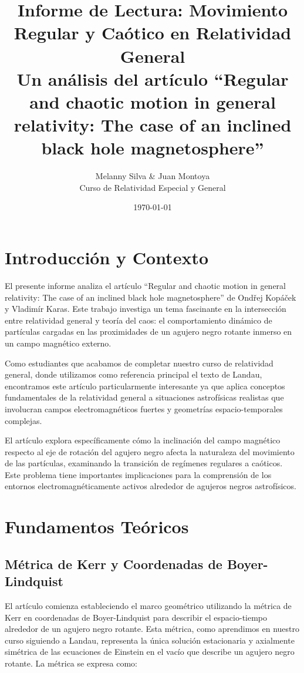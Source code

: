\documentclass[a4paper,12pt]{article}
\title{Informe de Lectura: Movimiento Regular y Caótico en Relatividad General\\
\large Un análisis del artículo ``Regular and chaotic motion in general relativity: The case of an inclined black hole magnetosphere''}
\author{Melanny Silva \& Juan Montoya\\
\small{Curso de Relatividad Especial y General}}
\date{\today}
\begin{document}
\maketitle

\section{Introducción y Contexto}

El presente informe analiza el artículo ``Regular and chaotic motion in general relativity: The case of an inclined black hole magnetosphere'' de Ondřej Kopáček y Vladimír Karas. Este trabajo investiga un tema fascinante en la intersección entre relatividad general y teoría del caos: el comportamiento dinámico de partículas cargadas en las proximidades de un agujero negro rotante inmerso en un campo magnético externo.

Como estudiantes que acabamos de completar nuestro curso de relatividad general, donde utilizamos como referencia principal el texto de Landau, encontramos este artículo particularmente interesante ya que aplica conceptos fundamentales de la relatividad general a situaciones astrofísicas realistas que involucran campos electromagnéticos fuertes y geometrías espacio-temporales complejas.

El artículo explora específicamente cómo la inclinación del campo magnético respecto al eje de rotación del agujero negro afecta la naturaleza del movimiento de las partículas, examinando la transición de regímenes regulares a caóticos. Este problema tiene importantes implicaciones para la comprensión de los entornos electromagnéticamente activos alrededor de agujeros negros astrofísicos.

\section{Fundamentos Teóricos}

\subsection{Métrica de Kerr y Coordenadas de Boyer-Lindquist}

El artículo comienza estableciendo el marco geométrico utilizando la métrica de Kerr en coordenadas de Boyer-Lindquist para describir el espacio-tiempo alrededor de un agujero negro rotante. Esta métrica, como aprendimos en nuestro curso siguiendo a Landau, representa la única solución estacionaria y axialmente simétrica de las ecuaciones de Einstein en el vacío que describe un agujero negro rotante. La métrica se expresa como:
\end{document}
